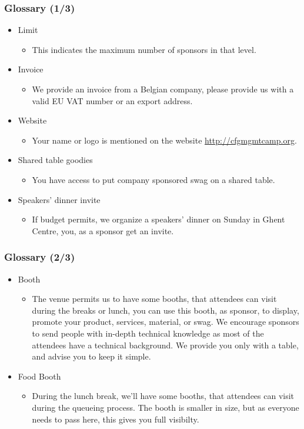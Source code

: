 \begin{frame}
\frametitle{Glossary (1/3)}
\begin{itemize}
	\item<+->
	Limit
	\begin{itemize}
		\item<+->
		This indicates the maximum number of sponsors in that level.
	\end{itemize}
	\item<+->
	Invoice
	\begin{itemize}
		\item<+->
		We provide an invoice from a Belgian company, please provide us with a valid EU VAT number or an export address.
	\end{itemize}
	\item<+->
	Website
	\begin{itemize}
		\item<+->
		Your name or logo is mentioned on the website \url{http://cfgmgmtcamp.org}.
	\end{itemize}
	\item<+->
	Shared table goodies
	\begin{itemize}
		\item<+->
		You have access to put company sponsored swag on a shared table.
	\end{itemize}
	\item<+->
	Speakers' dinner invite
	\begin{itemize}
		\item<+->
		If budget permits, we organize a speakers' dinner on Sunday in Ghent Centre, you, as a sponsor get an invite.
	\end{itemize}
\end{itemize}
\end{frame}

\begin{frame}
\frametitle{Glossary (2/3)}
\begin{itemize}
	\item<+->
	Booth
	\begin{itemize}
		\item<+->
		The venue permits us to have some booths, that attendees can visit during the breaks or lunch, you can use this booth, as sponsor, to display, promote your product, services, material, or swag.
		We encourage sponsors to send people with in-depth technical knowledge as most of the attendees have a technical background.
		We provide you only with a table, and advise you to keep it simple.
	\end{itemize}
	\item<+->
	Food Booth
	\begin{itemize}
		\item<+->
		During the lunch break, we'll have some booths, that attendees can visit during the queueing process.
		The booth is smaller in size, but as everyone needs to pass here, this gives you full visibilty.
	\end{itemize}
\end{itemize}
\end{frame}


